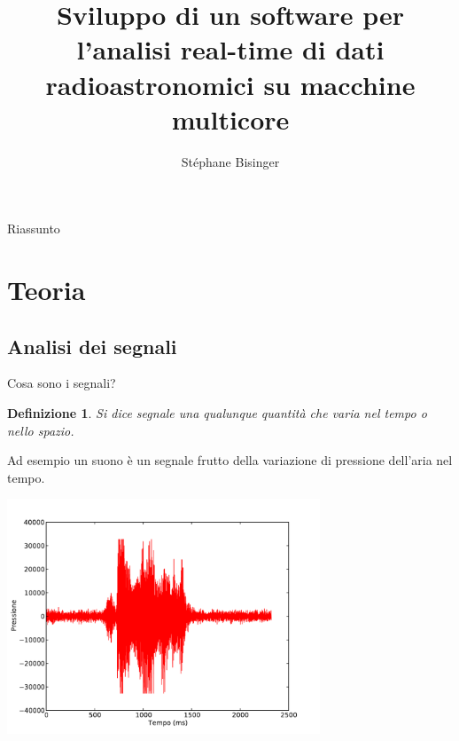 \documentclass[red]{beamer}
\title[Software per segnali radioastronomici]{Sviluppo di un software per l'analisi real-time di dati
radioastronomici su macchine multicore}
\author{Stéphane Bisinger}
\newtheorem{defs}{Definizione}[section]
\begin{document}
\begin{frame}
	\titlepage
\end{frame}

\begin{frame}{Riassunto}
	\tableofcontents
\end{frame}

\section{Teoria}
\subsection{Analisi dei segnali}
\begin{frame}{Cosa sono i segnali?}
	\transdissolve<3>
	\begin{defs} \label{def:signal}
		Si dice segnale una qualunque quantità che varia nel tempo o nello spazio.
	\end{defs}
	\pause

	Ad esempio un suono è un segnale frutto della variazione di pressione dell'aria nel tempo.
	\pause
	\begin{center}
		\includegraphics[width=0.7\textwidth]{img/segnale}
	\end{center}
\end{frame}
\end{document}

